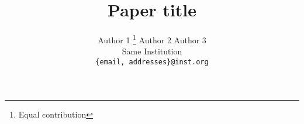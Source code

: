 
\newif\ifreview \newif\ifarxiv \newif\ifcamera
\reviewtrue

\def\cvprPaperID{0000}
\def\confName{CVPR}
\def\confYear{2022}





\title{Paper title}

\author{
    Author 1 \thanks{Equal contribution} \qquad
    Author 2 \footnotemark[1] \qquad
    Author 3 \\
    Same Institution \\
    {\tt\small \{email, addresses\}@inst.org}
}

\maketitle

\begin{abstract}  \end{abstract}







{\small


}

\ifarxiv \clearpage  \fi



